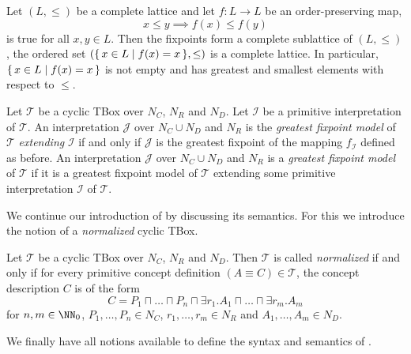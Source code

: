 \begin{Theorem}
  \label{thm:tarski-fixpoint-theorem}
  Let $(L, \leq)$ be a complete lattice and let $f \colon L \to L$ be an order-preserving
  map, \ie
  \begin{equation*}
    x \leq y \implies f(x) \leq f(y)
  \end{equation*}
  is true for all $x, y \in L$.  Then the fixpoints form a complete sublattice of $(L,
  \leq)$, \ie the ordered set $({\{\, x \in L \mid f(x) = x \,\}}, \leq)$ is a complete
  lattice.  In particular, ${\{\, x \in L \mid f(x) = x \,\}}$ is not empty and has greatest
  and smallest elements with respect to $\leq$.
\end{Theorem}

\begin{Definition}
  \label{def:gfp-models}
  Let $\mathcal{T}$ be a cyclic TBox over $N_C$, $N_R$ and $N_D$.  Let $\mathcal{I}$ be a
  primitive interpretation of $\mathcal{T}$.  An interpretation $\mathcal{J}$ over $N_C
  \cup N_D$ and $N_R$ is the \emph{greatest fixpoint model} of $\mathcal{T}$
  \emph{extending} $\mathcal{I}$ if and only if $\mathcal{J}$ is the greatest fixpoint of
  the mapping $f_{\mathcal{I}}$ defined as before.  An interpretation $\mathcal{J}$ over
  $N_C \cup N_D$ and $N_R$ is a \emph{greatest fixpoint model} of $\mathcal{T}$ if it is a
  greatest fixpoint model of $\mathcal{T}$ extending some primitive interpretation
  $\mathcal{I}$ of $\mathcal{T}$.
\end{Definition}

We continue our introduction of \ELgfpbot by discussing its semantics.  For this we
introduce the notion of a \emph{normalized} cyclic TBox.

\begin{Definition}
  \label{def:normalized-cyclic-TBox}
  Let $\mathcal{T}$ be a cyclic TBox over $N_C$, $N_R$ and $N_D$.  Then $\mathcal{T}$ is
  called \emph{normalized} if and only if for every primitive concept definition $(A
  \equiv C) \in \mathcal{T}$, the concept description $C$ is of the form
  \begin{equation*}
    C = P_1 \sqcap \dots \sqcap P_n \sqcap \exists r_1. A_1 \sqcap \dots \sqcap \exists r_m. A_m
  \end{equation*}
  for $n, m \in \NN_0$, $P_1, \dots, P_n \in N_C$, $r_1, \dots, r_m \in N_R$ and $A_1,
  \dots, A_m \in N_D$.
\end{Definition}

We finally have all notions available to define the syntax and semantics of \ELgfpbot.

